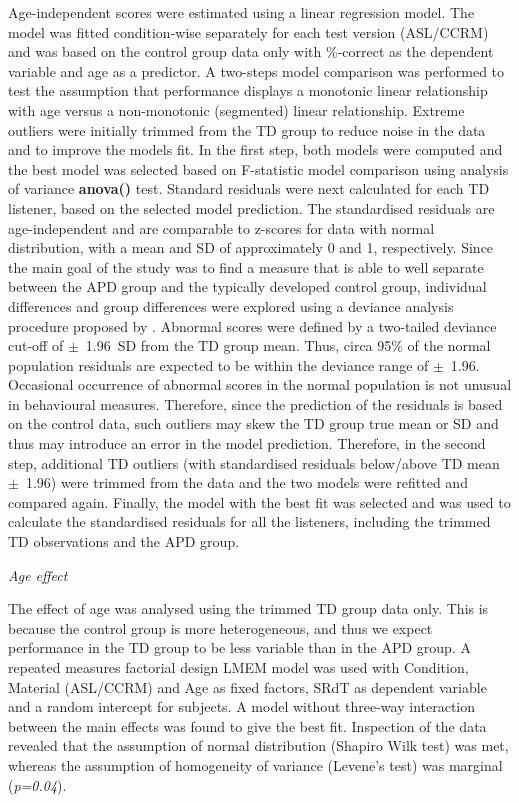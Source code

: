 \documentclass[a4paper, twoside]{templates/ociamthesis}
\begin{document}
Age-independent scores were estimated using a linear regression model. The model was fitted condition-wise separately for each test version (ASL/CCRM) and was based on the control group data only with \%-correct as the dependent variable and age as a predictor. A two-steps model comparison was performed to test the assumption that performance displays a monotonic linear relationship with age versus a non-monotonic (segmented) linear relationship. Extreme outliers were initially trimmed from the TD group to reduce noise in the data and to improve the models fit. In the first step, both models were computed and the best model was selected based on F-statistic model comparison using analysis of variance \textbf{anova()} test. Standard residuals were next calculated for each TD listener, based on the selected model prediction. The standardised residuals are age-independent and are comparable to z-scores for data with normal distribution, with a mean and SD of approximately 0 and 1, respectively. Since the main goal of the study was to find a measure that is able to well separate between the APD group and the typically developed control group, individual differences and group differences were explored using a deviance analysis procedure proposed by \textcite{Ramus2003}. Abnormal scores were defined by a two-tailed deviance cut-off of \(\pm\)~1.96~SD from the TD group mean. Thus, circa 95\% of the normal population residuals are expected to be within the deviance range of \(\pm\)~1.96. Occasional occurrence of abnormal scores in the normal population is not unusual in behavioural measures. Therefore, since the prediction of the residuals is based on the control data, such outliers may skew the TD group true mean or SD and thus may introduce an error in the model prediction. Therefore, in the second step, additional TD outliers (with standardised residuals below/above TD mean \(\pm\)~1.96) were trimmed from the data and the two models were refitted and compared again. Finally, the model with the best fit was selected and was used to calculate the standardised residuals for all the listeners, including the trimmed TD observations and the APD group.

\colorbox[HTML]{CCCCFF}{\emph{Age effect}}

The effect of age was analysed using the trimmed TD group data only. This is because the control group is more heterogeneous, and thus we expect performance in the TD group to be less variable than in the APD group. A repeated measures factorial design LMEM model was used with Condition, Material (ASL/CCRM) and Age as fixed factors, SRdT as dependent variable and a random intercept for subjects. A model without three-way interaction between the main effects was found to give the best fit. Inspection of the data revealed that the assumption of normal distribution (Shapiro Wilk test) was met, whereas the assumption of homogeneity of variance (Levene's test) was marginal (\emph{p=0.04}).
\end{document}
